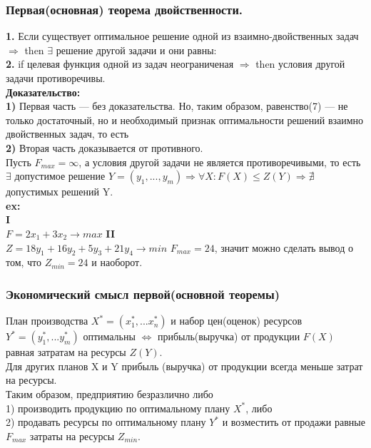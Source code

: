 \subsubsection{Первая(основная) теорема двойственности.}
\textbf{1.} Если существует оптимальное решение одной из взаимно-двойственных задач $\Rightarrow$ then $\exists$ решение другой задачи и они равны:\\
\textbf{2.} if целевая функция одной из задач неограниченая $\Rightarrow$ then условия другой задачи противоречивы.\\
\textbf{Доказательство:}\\
\textbf{1)} Первая часть --- без доказательства. Но, таким образом, равенство(7) --- не только достаточный, но и необходимый признак оптимальности решений взаимно двойственных задач, то есть\\
\textbf{2)} Вторая часть доказывается от противного.\\
Пусть $F_{max}=\infty$, а условия другой задачи не является противоречивыми, то есть $\exists$ допустимое решение $Y=(y_1,..., y_m) \Rightarrow \forall X : F(X) \leq Z(Y) \Rightarrow \nexists$ допустимых решений Y. \qedsymbol\\
\textbf{ex:}\\
\textbf{I} \\
$F=2x_1+3x_2 \rightarrow max$
\textbf{II}\\
$Z=18y_1+16y_2+5y_3+21y_4 \rightarrow min$
$F_{max}=24$, значит можно сделать вывод о том, что $Z_{min}=24$ и наоборот.
\subsubsection{Экономический смысл первой(основной теоремы)}
План производства $X^*=(x_1^*,...x_n^*)$ и набор цен(оценок) ресурсов $Y^*=(y_1^*,...y_m^*) $ оптимальны $\Leftrightarrow$ прибыль(выручка) от продукции $F(X)$ равная затратам на ресурсы $Z(Y)$.\\
Для других планов X и Y прибыль (выручка) от продукции всегда меньше затрат на ресурсы. \\
Таким образом, предприятию безразлично либо \\1) производить продукцию по оптимальному плану $X^*$, либо \\2) продавать ресурсы по оптимальному плану $Y^*$ и возместить от продажи равные $F_{max}$ затраты на ресурсы $Z_{min}$.\\

